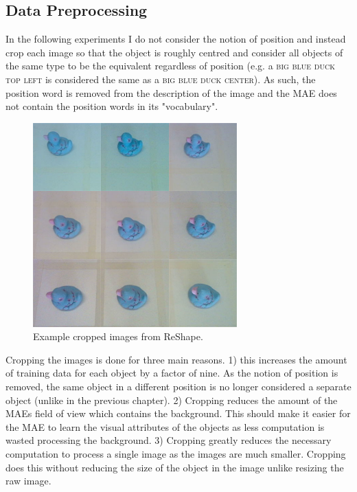 \subsection{Data Preprocessing}

In the following experiments I do not consider the notion of position and instead crop each image so that the object is roughly centred and consider all objects of the same type to be the equivalent regardless of position (e.g. a \textsc{big blue duck top left} is considered the same as a \textsc{big blue duck center}). As such, the position word is removed from the description of the image and the MAE does not contain the position words in its "vocabulary".

\begin{figure}[h]
    \centering
    \includegraphics[width=0.7\textwidth]{Figs/chapter6/ReShapeCrop.png}
    \caption{Example cropped images from ReShape.}
    \label{fig:ReShapeCrop}
\end{figure}

Cropping the images is done for three main reasons. 1) this increases the amount of training data for each object by a factor of nine. As the notion of position is removed, the same object in a different position is no longer considered a separate object (unlike in the previous chapter). 2) Cropping reduces the amount of the MAEs field of view which contains the background. This should make it easier for the MAE to learn the visual attributes of the objects as less computation is wasted processing the background. 3) Cropping greatly reduces the necessary computation to process a single image as the images are much smaller. Cropping does this without reducing the size of the object in the image unlike resizing the raw image.

